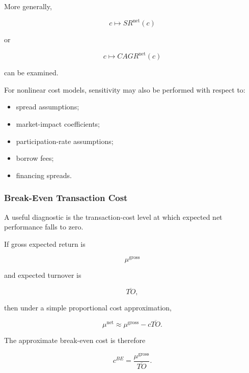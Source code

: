 \documentclass[11pt,a4paper]{article}
\begin{document}
More generally,

\begin{equation}
\boxed{
c
\longmapsto
SR^{\mathrm{net}}(c)
}
\end{equation}

or

\begin{equation}
\boxed{
c
\longmapsto
CAGR^{\mathrm{net}}(c)
}
\end{equation}

can be examined.

For nonlinear cost models, sensitivity may also be performed with respect to:

\begin{itemize}
    \item spread assumptions;
    \item market-impact coefficients;
    \item participation-rate assumptions;
    \item borrow fees;
    \item financing spreads.
\end{itemize}


\subsubsection{Break-Even Transaction Cost}

A useful diagnostic is the transaction-cost level at which expected net
performance falls to zero.

If gross expected return is

\begin{equation}
\mu^{\mathrm{gross}}
\end{equation}

and expected turnover is

\begin{equation}
\overline{TO},
\end{equation}

then under a simple proportional cost approximation,

\begin{equation}
\mu^{\mathrm{net}}
\approx
\mu^{\mathrm{gross}}
-
c\overline{TO}.
\end{equation}

The approximate break-even cost is therefore

\begin{equation}
\boxed{
c^{BE}
=
\frac{
\mu^{\mathrm{gross}}
}{
\overline{TO}
}.
}
\end{equation}
\end{document}
